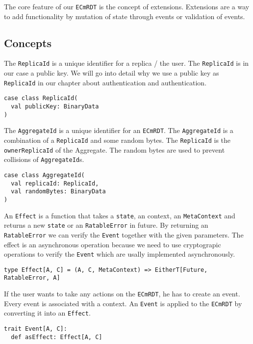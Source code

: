 \documentclass[
	ngerman,
	ruledheaders=section,   %
	class=report,		    %
	thesis={type=bachelor}, %
	accentcolor=9c,			%
	custommargins=false,    %
	marginpar=false,        %
	parskip=half-,          %
	fontsize=11pt,          %
]{tudapub}
\let\code\texttt
\begin{document}
The core feature of our \code{ECmRDT} is the concept of extensions. Extensions are a way to add functionality by mutation of state through events or validation of events. 

\subsection{Concepts}

The \code{ReplicaId} is a unique identifier for a replica / the user. The \code{ReplicaId} is in our case a public key. We will go into detail why we use a public key as \code{ReplicaId} in our chapter about authentication and authentication.

\begin{lstlisting}
case class ReplicaId(
  val publicKey: BinaryData
)
\end{lstlisting}

The \code{AggregateId} is a unique identifier for an \code{ECmRDT}. The \code{AggregateId} is a combination of a \code{ReplicaId} and some random bytes. The \code{ReplicaId} is the \code{ownerReplicaId} of the Aggregate. The random bytes are used to prevent collisions of \code{AggregateId}s.

\begin{lstlisting}
case class AggregateId(
  val replicaId: ReplicaId,
  val randomBytes: BinaryData
)
\end{lstlisting}

An \code{Effect} is a function that takes a \code{state}, an context, an \code{MetaContext} and returns a new \code{state} or an \code{RatableError} in future. By returning an \code{RatableError} we can verify the \code{Event} together with the given parameters. The effect is an asynchronous operation because we need to use cryptograpic operations to verify the \code{Event} which are usally implemented asynchronously.

\begin{lstlisting}
type Effect[A, C] = (A, C, MetaContext) => EitherT[Future, RatableError, A]
\end{lstlisting}

If the user wants to take any actions on the \code{ECmRDT}, he has to create an event. Every event is associated with a context. An \code{Event} is applied to the \code{ECmRDT} by converting it into an \code{Effect}.

\begin{lstlisting}
trait Event[A, C]:
  def asEffect: Effect[A, C]
\end{lstlisting}
\end{document}
